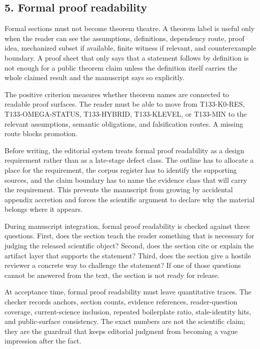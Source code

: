 \subsection{5. Formal proof readability}

Formal sections must not become theorem theatre. A theorem label is useful only when the reader can see the assumptions, definitions, dependency route, proof idea, mechanized subset if available, finite witness if relevant, and counterexample boundary. A proof sheet that only says that a statement follows by definition is not enough for a public theorem claim unless the definition itself carries the whole claimed result and the manuscript says so explicitly.


The positive criterion measures whether theorem names are connected to readable proof surfaces. The reader must be able to move from T133-K0-RES, T133-OMEGA-STATUS, T133-HYBRID, T133-KLEVEL, or T133-MIN to the relevant assumptions, semantic obligations, and falsification routes. A missing route blocks promotion.


Before writing, the editorial system treats formal proof readability as a design requirement rather than as a late-stage defect class. The outline has to allocate a place for the requirement, the corpus register has to identify the supporting sources, and the claim boundary has to name the evidence class that will carry the requirement. This prevents the manuscript from growing by accidental appendix accretion and forces the scientific argument to declare why the material belongs where it appears.


During manuscript integration, formal proof readability is checked against three questions. First, does the section teach the reader something that is necessary for judging the released scientific object? Second, does the section cite or explain the artifact layer that supports the statement? Third, does the section give a hostile reviewer a concrete way to challenge the statement? If one of those questions cannot be answered from the text, the section is not ready for release.


At acceptance time, formal proof readability must leave quantitative traces. The checker records anchors, section counts, evidence references, reader-question coverage, current-science inclusion, repeated boilerplate ratio, stale-identity hits, and public-surface consistency. The exact numbers are not the scientific claim; they are the guardrail that keeps editorial judgment from becoming a vague impression after the fact.


